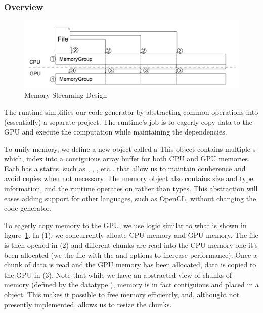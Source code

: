 \subsubsection{Overview}


\begin{figure}
\centering
\includegraphics[scale=0.2]{fig/memory_group.pdf}
\caption{Memory Streaming Design}
\label{fig:memorygroup}
\centering
\end{figure}

The runtime simplifies our code generator by abstracting common operations
	into (essentially) a separate project.
The runtime's job is to eagerly copy data to the GPU and execute the
 	computation while maintaining the dependencies.

To unify memory, we define a new object called a 
This object contains multiple s which,
	index into a contiguious array buffer for both CPU and GPU memories.
Each  has a status, such as
	, ,
	, etc\ldots
	that allow us to maintain conherence and avoid copies when
	not necessary.
The memory object also contains size and type information,
	and the runtime operates on  rather than 
	types.
This abstraction will eases adding support for other languages, such
	as OpenCL, without changing the code generator.

To eagerly copy memory to the GPU, we use logic similar to what is
	shown in figure~\ref{fig:memorygroup}.
In (1), we concurrently alloate CPU memory and GPU memory.
The file is then opened in (2) and different chunks are read into
	the CPU memory one it's been allocated (we  the file
	with the  and  options to increase
	performance).
Once a chunk of data is read and the GPU memory has been allocated, data
	is copied to the GPU in (3).
Note that while we have an abstracted view of chunks of memory
	(defined by the datatype ), memory is in fact
	contiguious and placed in a  object.
This makes it possible to free memory efficiently, and, althought
	not presently implemented, allows us to resize the chunks.
